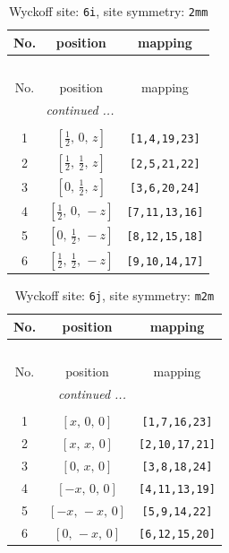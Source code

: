 \documentclass[fleqn,8pt]{jsarticle}
\begin{document}
\renewcommand{\arraystretch}{1.2}
\begin{longtable}{ccc}
\caption{Wyckoff site: {\tt 6i}, site symmetry: {\tt 2mm}}
 \\
 \hline \hline
No. & position & mapping \\ \hline \endfirsthead

\multicolumn{2}{l}{\tablename\ \thetable{}} \\
 \hline \hline
No. & position & mapping \\ \hline \endhead

 \hline \hline
\multicolumn{2}{r}{\footnotesize\it continued ...} \\ \endfoot

 \hline \hline
\multicolumn{2}{r}{} \\ \endlastfoot

1 & $\left[ \frac{1}{2},\, 0,\, z \right]$ & {\tt [1,4,19,23]} \\ \hline
2 & $\left[ \frac{1}{2},\, \frac{1}{2},\, z \right]$ & {\tt [2,5,21,22]} \\ \hline
3 & $\left[ 0,\, \frac{1}{2},\, z \right]$ & {\tt [3,6,20,24]} \\ \hline
4 & $\left[ \frac{1}{2},\, 0,\, - z \right]$ & {\tt [7,11,13,16]} \\ \hline
5 & $\left[ 0,\, \frac{1}{2},\, - z \right]$ & {\tt [8,12,15,18]} \\ \hline
6 & $\left[ \frac{1}{2},\, \frac{1}{2},\, - z \right]$ & {\tt [9,10,14,17]} \\
\end{longtable}
\renewcommand{\arraystretch}{1.2}
\begin{longtable}{ccc}
\caption{Wyckoff site: {\tt 6j}, site symmetry: {\tt m2m}}
 \\
 \hline \hline
No. & position & mapping \\ \hline \endfirsthead

\multicolumn{2}{l}{\tablename\ \thetable{}} \\
 \hline \hline
No. & position & mapping \\ \hline \endhead

 \hline \hline
\multicolumn{2}{r}{\footnotesize\it continued ...} \\ \endfoot

 \hline \hline
\multicolumn{2}{r}{} \\ \endlastfoot

1 & $\left[ x,\, 0,\, 0 \right]$ & {\tt [1,7,16,23]} \\ \hline
2 & $\left[ x,\, x,\, 0 \right]$ & {\tt [2,10,17,21]} \\ \hline
3 & $\left[ 0,\, x,\, 0 \right]$ & {\tt [3,8,18,24]} \\ \hline
4 & $\left[ - x,\, 0,\, 0 \right]$ & {\tt [4,11,13,19]} \\ \hline
5 & $\left[ - x,\, - x,\, 0 \right]$ & {\tt [5,9,14,22]} \\ \hline
6 & $\left[ 0,\, - x,\, 0 \right]$ & {\tt [6,12,15,20]} \\
\end{longtable}
\end{document}
